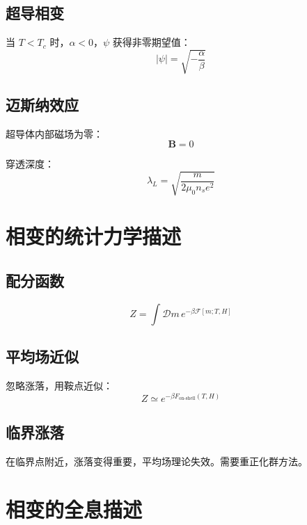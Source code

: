 \documentclass[12pt,a4paper]{ctexart}
\begin{document}
\subsection{超导相变}

当 $T < T_c$ 时，$\alpha < 0$，$\psi$ 获得非零期望值：
\begin{equation}
    |\psi| = \sqrt{-\frac{\alpha}{\beta}}
\end{equation}

\subsection{迈斯纳效应}

超导体内部磁场为零：
\begin{equation}
    \mathbf{B} = 0
\end{equation}

穿透深度：
\begin{equation}
    \lambda_L = \sqrt{\frac{m}{2\mu_0 n_s e^2}}
\end{equation}

\section{相变的统计力学描述}

\subsection{配分函数}

\begin{equation}
    Z = \int \mathcal{D}m \, e^{-\beta \mathcal{F}[m; T, H]}
\end{equation}

\subsection{平均场近似}

忽略涨落，用鞍点近似：
\begin{equation}
    Z \simeq e^{-\beta F_{\text{on-shell}}(T, H)}
\end{equation}

\subsection{临界涨落}

在临界点附近，涨落变得重要，平均场理论失效。需要重正化群方法。

\section{相变的全息描述}
\end{document}
